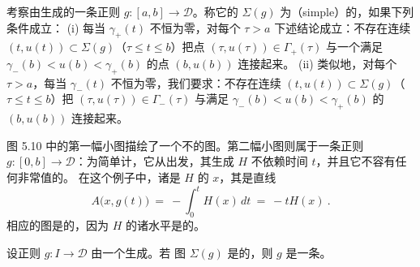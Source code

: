 \begin{definition}\label{def:simple-diagram}
考察由\trQuasiAutonomous\trHamiltonianFunction{}生成的一条正则\trPath{} $g:[a,b]\to\mathcal{D}$。称它的%
\trBifurcationDiagram{} $\Sigma(g)$ 为\textbf{\trSimple}（simple）的，如果下列条件成立：
(i) 每当 $\gamma_{+}(t)$ 不恒为零，对每个 $\tau>a$ 下述结论成立：不存在连续\trCurve{}%
$(t,u(t))\subset\Sigma(g)$（$\tau\leq t\leq b$）把点 $(\tau,u(\tau))\in\Gamma_{+}(\tau)$%
与一个满足 $\gamma_{-}(b)<u(b)<\gamma_{+}(b)$ 的点 $(b,u(b))$ 连接起来。
(ii) 类似地，对每个 $\tau>a$，每当 $\gamma_{-}(t)$ 不恒为零，我们要求：不存在连续%
\trCurve{} $(t,u(t))\subset\Sigma(g)$（$\tau\leq t\leq b$）把 $(\tau,u(\tau))\in%
\Gamma_{-}(\tau)$ 与满足 $\gamma_{-}(b)<u(b)<\gamma_{+}(b)$ 的 $(b,u(b))$ 连接起来。
\end{definition}

图 5.10 中的第一幅小图描绘了一个不\trSimple{}的图。第二幅小图则属于一条正则\trPath%
$g:[0,b]\to\mathcal{D}$：为简单计，它从\trIdentityMap{}出发，其生成%
\trHamiltonianFunction{} $H$ 不依赖时间 $t$，并且它不容有任何非常值的\trPeriodicOrbit。%
在这个例子中，诸\trFixedPoint{}是 $H$ 的\trCriticalPoint{} $x$，其\trAction{}是直线
\[
A\bigl(x,g(t)\bigr)\ =\ -\int_{0}^{t}H(x)\,dt\ =\ -tH(x)\ .
\]
相应的\trBifurcation{}图是\trSimple{}的，因为 $H$ 的诸\trCritical{}水平是\trNowhereDense{}的。

\begin{theorem}[\trBialy-\trPolterovich]\label{thm:simple-diagram-geodesic}
设正则\trSmooth\trPath{} $g:I\to\mathcal{D}$ 由一个\trQuasiAutonomous\trHamiltonianFunction{}生成。若%
\trBifurcation{}图 $\Sigma(g)$ 是\trSimple{}的，则 $g$ 是一条\trMinimal\trGeodesic。
\end{theorem}

